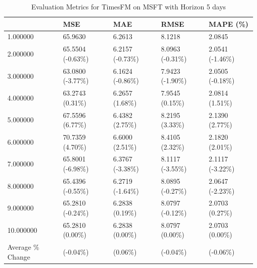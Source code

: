 \begin{table}
\caption{Evaluation Metrics for TimesFM on MSFT with Horizon 5 days}
\label{tab:fm_MSFT_h5_metrics}
\begin{tabular}{lllll}
\toprule
 & MSE & MAE & RMSE & MAPE (\%) \\
\midrule
1.000000 & 65.9630 & 6.2613 & 8.1218 & 2.0845 \\
2.000000 & 65.5504 (-0.63\%) & 6.2157 (-0.73\%) & 8.0963 (-0.31\%) & 2.0541 (-1.46\%) \\
3.000000 & 63.0800 (-3.77\%) & 6.1624 (-0.86\%) & 7.9423 (-1.90\%) & 2.0505 (-0.18\%) \\
4.000000 & 63.2743 (0.31\%) & 6.2657 (1.68\%) & 7.9545 (0.15\%) & 2.0814 (1.51\%) \\
5.000000 & 67.5596 (6.77\%) & 6.4382 (2.75\%) & 8.2195 (3.33\%) & 2.1390 (2.77\%) \\
6.000000 & 70.7359 (4.70\%) & 6.6000 (2.51\%) & 8.4105 (2.32\%) & 2.1820 (2.01\%) \\
7.000000 & 65.8001 (-6.98\%) & 6.3767 (-3.38\%) & 8.1117 (-3.55\%) & 2.1117 (-3.22\%) \\
8.000000 & 65.4396 (-0.55\%) & 6.2719 (-1.64\%) & 8.0895 (-0.27\%) & 2.0647 (-2.23\%) \\
9.000000 & 65.2810 (-0.24\%) & 6.2838 (0.19\%) & 8.0797 (-0.12\%) & 2.0703 (0.27\%) \\
10.000000 & 65.2810 (0.00\%) & 6.2838 (0.00\%) & 8.0797 (0.00\%) & 2.0703 (0.00\%) \\
Average \% Change & (-0.04\%) & (0.06\%) & (-0.04\%) & (-0.06\%) \\
\bottomrule
\end{tabular}
\end{table}
